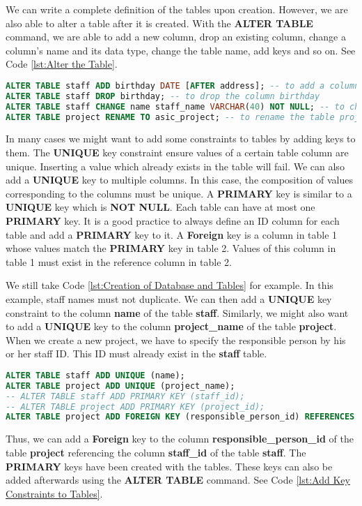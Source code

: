 We can write a complete definition of the tables upon creation. However, we are also able to alter a table after it is created. With the \textbf{ALTER TABLE} command, we are able to add a new column, drop an existing column, change a column's name and its data type, change the table name, add keys and so on. See Code \ref{lst:Alter the Table}.

\begin{lstlisting}[language=SQL, caption={Alter the Table\label{lst:Alter the Table}}]
ALTER TABLE staff ADD birthday DATE [AFTER address]; -- to add a column birthday [after address]
ALTER TABLE staff DROP birthday; -- to drop the column birthday
ALTER TABLE staff CHANGE name staff_name VARCHAR(40) NOT NULL; -- to change the column name and its data type
ALTER TABLE project RENAME TO asic_project; -- to rename the table project
\end{lstlisting}

In many cases we might want to add some constraints to tables by adding keys to them. The \textbf{UNIQUE} key constraint ensure values of a certain table column are unique. Inserting a value which already exists in the table will fail. We can also add a \textbf{UNIQUE} key to multiple columns. In this case, the composition of values corresponding to the columns must be unique. A \textbf{PRIMARY} key is similar to a \textbf{UNIQUE} key which is \textbf{NOT NULL}. Each table can have at most one \textbf{PRIMARY} key. It is a good practice to always define an ID column for each table and add a \textbf{PRIMARY} key to it. A \textbf{Foreign} key is a column in table 1 whose values match the \textbf{PRIMARY} key in table 2. Values of this column in table 1 must exist in the reference column in table 2.

We still take Code \ref{lst:Creation of Database and Tables} for example. In this example, staff names must not duplicate. We can then add a \textbf{UNIQUE} key constraint to the column \textbf{name} of the table \textbf{staff}. Similarly, we might also want to add a \textbf{UNIQUE} key to the column \textbf{project\_name} of the table \textbf{project}. When we create a new project, we have to specify the responsible person by his or her staff ID. This ID must already exist in the \textbf{staff} table.
\begin{lstlisting}[language=SQL, caption={Add Key Constraints to Tables\label{lst:Add Key Constraints to Tables}}]
ALTER TABLE staff ADD UNIQUE (name);
ALTER TABLE project ADD UNIQUE (project_name);
-- ALTER TABLE staff ADD PRIMARY KEY (staff_id);
-- ALTER TABLE project ADD PRIMARY KEY (project_id);
ALTER TABLE project ADD FOREIGN KEY (responsible_person_id) REFERENCES staff (staff_id);
\end{lstlisting}
Thus, we can add a \textbf{Foreign} key to the column \textbf{responsible\_person\_id} of the table \textbf{project} referencing the column \textbf{staff\_id} of the table \textbf{staff}. The \textbf{PRIMARY} keys have been created with the tables. These keys can also be added afterwards using the \textbf{ALTER TABLE} command. See Code \ref{lst:Add Key Constraints to Tables}.

